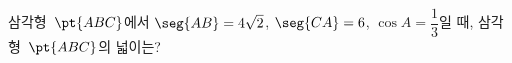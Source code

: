 삼각형~$\pt{ABC}$에서 $\seg{AB}=4\sqrt{2}$, $\seg{CA}=6$, $\cos A=\dfrac{1}{3}$일 때, 삼각형~$\pt{ABC}$의 넓이는?
